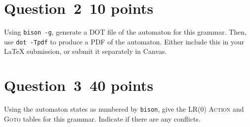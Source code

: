\documentclass[10pt]{article}
\begin{document}

\section*{Question~2~\hfill 10 points}

Using {\tt bison -g}, generate a DOT file of the automaton
for this grammar.
Then, use {\tt dot -Tpdf} to produce a PDF of the automaton.
Either include this in your \LaTeX{} submission, or submit it separately
in Canvas.

\begin{framed}
\end{framed}
\newpage
\section*{Question~3~\hfill 40 points}

Using the automaton states as numbered by {\tt bison},
give the LR(0) \textsc{Action} and \textsc{Goto} tables
for this grammar.
Indicate if there are any conflicts.

\end{document}
